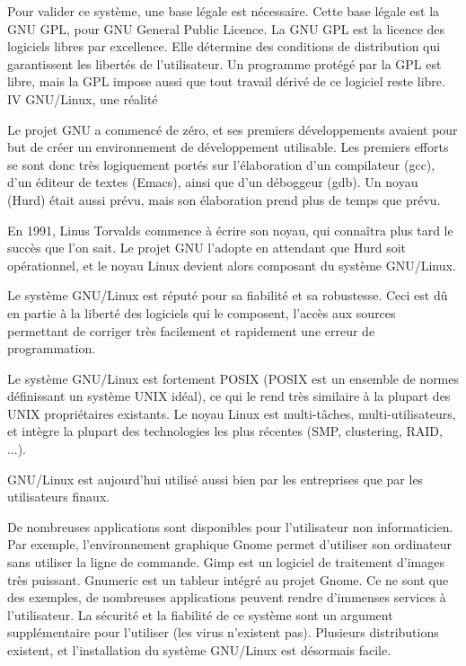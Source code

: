 \documentclass{article}
\begin{document}
Pour valider ce système, une base légale est nécessaire. Cette base légale est la GNU GPL, pour GNU General Public Licence. La GNU GPL est la licence des logiciels libres par excellence. Elle détermine des conditions de distribution qui garantissent les libertés de l'utilisateur. Un programme protégé par la GPL est libre, mais la GPL impose aussi que tout travail dérivé de ce logiciel reste libre.
IV  GNU/Linux, une réalité

Le projet GNU a commencé de zéro, et ses premiers développements avaient pour but de créer un environnement de développement utilisable. Les premiers efforts se sont donc très logiquement portés sur l'élaboration d'un compilateur (gcc), d'un éditeur de textes (Emacs), ainsi que d'un déboggeur (gdb). Un noyau (Hurd) était aussi prévu, mais son élaboration prend plus de temps que prévu.

En 1991, Linus Torvalds commence à écrire son noyau, qui connaîtra plus tard le succès que l'on sait. Le projet GNU l'adopte en attendant que Hurd soit opérationnel, et le noyau Linux devient alors composant du système GNU/Linux.

Le système GNU/Linux est réputé pour sa fiabilité et sa robustesse. Ceci est dû en partie à la liberté des logiciels qui le composent, l'accès aux sources permettant de corriger très facilement et rapidement une erreur de programmation.

Le système GNU/Linux est fortement POSIX (POSIX est un ensemble de normes définissant un système UNIX idéal), ce qui le rend très similaire à la plupart des UNIX propriétaires existants. Le noyau Linux est multi-tâches, multi-utilisateurs, et intègre la plupart des technologies les plus récentes (SMP, clustering, RAID, ...).

GNU/Linux est aujourd'hui utilisé aussi bien par les entreprises que par les utilisateurs finaux.

De nombreuses applications sont disponibles pour l'utilisateur non informaticien. Par exemple, l'environnement graphique Gnome permet d'utiliser son ordinateur sans utiliser la ligne de commande. Gimp est un logiciel de traitement d'images très puissant. Gnumeric est un tableur intégré au projet Gnome. Ce ne sont que des exemples, de nombreuses applications peuvent rendre d'immenses services à l'utilisateur. La sécurité et la fiabilité de ce système sont un argument supplémentaire pour l'utiliser (les virus n'existent pas). Plusieurs distributions existent, et l'installation du système GNU/Linux est désormais facile.
\end{document}
